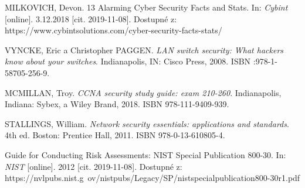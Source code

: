 

\begin{literatura}{99}
MILKOVICH, Devon. 13 Alarming Cyber Security Facts and Stats. In: \textit{Cybint} [online]. 3.12.2018 [cit. 2019-11-08]. Dostupné z: https://www.cybintsolutions.com/cyber-security-facts-stats/

VYNCKE, Eric a Christopher PAGGEN. \textit{LAN switch security: What hackers know about your switches}. Indianapolis, IN: Cisco Press, 2008. ISBN :978-1-58705-256-9.	
	
MCMILLAN, Troy. \textit{CCNA security study guide: exam 210-260}. Indianapolis, Indiana: Sybex, a Wiley Brand, 2018. ISBN 978-111-9409-939.
	
STALLINGS, William. \textit{Network security essentials: applications and standards}. 4th ed. Boston: Prentice Hall, 2011. ISBN 978-0-13-610805-4.

Guide for Conducting Risk Assessments: NIST Special Publication 800-30. In: \textit{NIST} [online]. 2012 [cit. 2019-11-08]. Dostupné z: https://nvlpubs.nist.g\
ov/nistpubs/Legacy/SP/nistspecialpublication800-30r1.pdf

	
	

\end{literatura}

